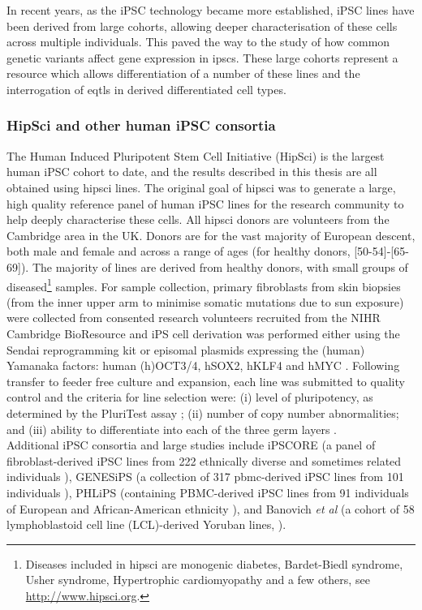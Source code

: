 In recent years, as the iPSC technology became more established, iPSC lines have been derived from large cohorts, allowing deeper characterisation of these cells across multiple individuals.
This paved the way to the study of how common genetic variants affect gene expression in \glspl{ipsc}.
These large cohorts represent a resource which allows differentiation of a number of these lines and the interrogation of \glspl{eqtl} in derived differentiated cell types.

\subsubsection{HipSci and other human iPSC consortia}
\label{sec:HipSci}

The Human Induced Pluripotent Stem Cell Initiative (HipSci) \cite{kilpinen2017common} is the largest human iPSC cohort to date, and the results described in this thesis are all obtained using \gls{hipsci} lines.
The original goal of \gls{hipsci} was to generate a large, high quality reference panel of human iPSC lines for the research community to help deeply characterise these cells. 
All \gls{hipsci} donors are volunteers from the Cambridge area in the UK. 
Donors are for the vast majority of European descent, both male and female and across a range of ages (for healthy donors, [50-54]-[65-69]).
The majority of lines are derived from healthy donors, with small groups of diseased\footnote{Diseases included in \gls{hipsci} are monogenic diabetes, Bardet-Biedl syndrome, Usher syndrome, Hypertrophic cardiomyopathy and a few others, see \url{http://www.hipsci.org}.} samples.
For sample collection, primary fibroblasts from skin biopsies (from the inner upper arm to minimise somatic mutations due to sun exposure) were collected from consented research volunteers recruited from the NIHR Cambridge BioResource and iPS cell derivation was performed either using the Sendai reprogramming kit or episomal plasmids expressing the (human) Yamanaka factors: human (h)OCT3/4, hSOX2, hKLF4 and hMYC \cite{yu2009human}.
Following transfer to feeder free culture and expansion, each line was submitted to quality control and the criteria for line selection were: (i) level of pluripotency, as determined by the PluriTest assay \cite{muller2011bioinformatic}; (ii) number of copy number abnormalities; and (iii) ability to differentiate into each of the three germ layers \cite{kilpinen2017common}. \\


Additional iPSC consortia and large studies include
iPSCORE (a panel of fibroblast-derived iPSC lines from 222 ethnically diverse and sometimes related individuals \cite{panopoulos2017ipscore}), GENESiPS (a collection of 317 \gls{pbmc}-derived iPSC lines from 101 individuals \cite{carcamo2017analysis}), PHLiPS (containing PBMC-derived iPSC lines from 91 individuals of European and African-American ethnicity \cite{pashos2017large}), and Banovich \textit{et al} (a cohort of 58 lymphoblastoid cell line (LCL)-derived Yoruban lines, \cite{banovich2018impact}).

